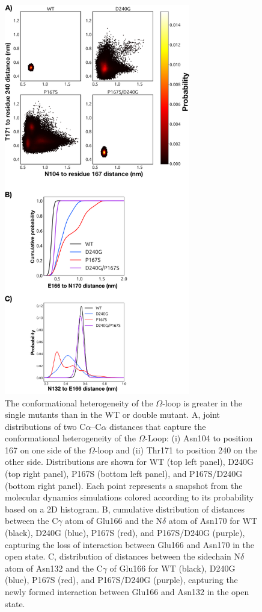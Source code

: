 \documentclass[../main.tex]{subfiles}
\begin{document}
        \begin{figure}[!htb] %
            \centering
            \includegraphics[width=3.2in]{ch2-fig9.png}
            \caption[The conformational heterogeneity of the $\Omega$-loop is greater in the single mutants than in the WT or double mutant.]
                {The conformational heterogeneity of the $\Omega$-loop is greater in the single mutants than in the WT or double mutant. A, joint distributions of two C$\alpha$–C$\alpha$ distances that capture the conformational heterogeneity of the $\Omega$-Loop: (i) Asn104 to position 167 on one side of the $\Omega$-loop and (ii) Thr171 to position 240 on the other side. Distributions are shown for WT (top left panel), D240G (top right panel), P167S (bottom left panel), and P167S/D240G (bottom right panel). Each point represents a snapshot from the molecular dynamics simulations colored according to its probability based on a 2D histogram. B, cumulative distribution of distances between the C$\gamma$ atom of Glu166 and the N$\delta$ atom of Asn170 for WT (black), D240G (blue), P167S (red), and P167S/D240G (purple), capturing the loss of interaction between Glu166 and Asn170 in the open state. C, distribution of distances between the sidechain N$\delta$ atom of Asn132 and the C$\gamma$ of Glu166 for WT (black), D240G (blue), P167S (red), and P167S/D240G (purple), capturing the newly formed interaction between Glu166 and Asn132 in the open state.}
            \label{fig:ch2-fig9}
        \end{figure}
\end{document}
